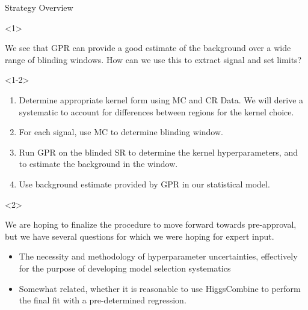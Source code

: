 \documentclass[10pt]{beamer}
\begin{document}
\begin{frame}{Strategy Overview}
  \begin{onlyenv}<1>
    \begin{block}{}
      We see that GPR can provide a good estimate of the background over a wide range of blinding windows. How can we use this to extract signal and set limits?
    \end{block}
  \end{onlyenv}
  \begin{onlyenv}<1-2>
    \begin{enumerate}
    \item Determine appropriate kernel form using MC and CR Data. We will derive a systematic to account for differences between regions for the kernel choice.
    \item For each signal, use MC to determine blinding window. 
    \item Run GPR on the blinded SR to determine the kernel hyperparameters, and to estimate the background in the window.
    \item\label{item:5} Use background estimate provided by GPR in our statistical model.
    \end{enumerate}
  \end{onlyenv}
  \begin{onlyenv}<2>
    \begin{block}{
      }    We are hoping to finalize the procedure to move forward towards pre-approval, but we have several questions for which we were hoping for expert input.
      \begin{itemize}

      \item The necessity and methodology of hyperparameter uncertainties, effectively for the purpose of developing model selection systematics%
        
      \item Somewhat related, whether it is reasonable to use HiggsCombine to perform the final fit with a pre-determined regression.
      \end{itemize}
    \end{block}
  \end{onlyenv}
\end{frame}
\end{document}
